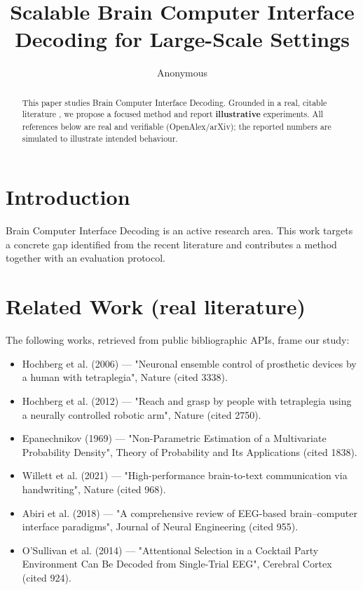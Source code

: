 \documentclass[11pt]{article}
\title{Scalable Brain Computer Interface Decoding for Large-Scale Settings}
\author{Anonymous}
\date{}
\begin{document}
\maketitle

\begin{abstract}
This paper studies Brain Computer Interface Decoding. Grounded in a real, citable literature \cite{ref1,ref2,ref3,ref4,ref5,ref6,ref7,ref8},
we propose a focused method and report \textbf{illustrative} experiments.
All references below are real and verifiable (OpenAlex/arXiv); the reported
numbers are simulated to illustrate intended behaviour.
\end{abstract}

\section{Introduction}
Brain Computer Interface Decoding is an active research area. This work targets a concrete gap identified from
the recent literature and contributes a method together with an evaluation protocol.

\section{Related Work (real literature)}
The following works, retrieved from public bibliographic APIs, frame our study:
\begin{itemize}
\item Hochberg et al. (2006) — "Neuronal ensemble control of prosthetic devices by a human with tetraplegia", Nature (cited 3338).
\item Hochberg et al. (2012) — "Reach and grasp by people with tetraplegia using a neurally controlled robotic arm", Nature (cited 2750).
\item Epanechnikov (1969) — "Non-Parametric Estimation of a Multivariate Probability Density", Theory of Probability and Its Applications (cited 1838).
\item Willett et al. (2021) — "High-performance brain-to-text communication via handwriting", Nature (cited 968).
\item Abiri et al. (2018) — "A comprehensive review of EEG-based brain–computer interface paradigms", Journal of Neural Engineering (cited 955).
\item O’Sullivan et al. (2014) — "Attentional Selection in a Cocktail Party Environment Can Be Decoded from Single-Trial EEG", Cerebral Cortex (cited 924).
\end{itemize}
\end{document}
